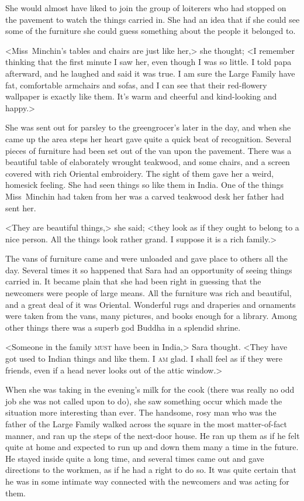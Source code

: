 She would almost have liked to join the group of loiterers who had stopped on the pavement to watch the things carried in. She had an idea that if she could see some of the furniture she could guess something about the people it belonged to.

<Miss~Minchin's tables and chairs are just like her,> she thought; <I remember thinking that the first minute I saw her, even though I was so little. I told papa afterward, and he laughed and said it was true. I am sure the Large Family have fat, comfortable armchairs and sofas, and I can see that their red-flowery wallpaper is exactly like them. It's warm and cheerful and kind-looking and happy.>

She was sent out for parsley to the greengrocer's later in the day, and when she came up the area steps her heart gave quite a quick beat of recognition. Several pieces of furniture had been set out of the van upon the pavement. There was a beautiful table of elaborately wrought teakwood, and some chairs, and a screen covered with rich Oriental embroidery. The sight of them gave her a weird, homesick feeling. She had seen things so like them in India. One of the things Miss~Minchin had taken from her was a carved teakwood desk her father had sent her.

<They are beautiful things,> she said; <they look as if they ought to belong to a nice person. All the things look rather grand. I suppose it is a rich family.>

The vans of furniture came and were unloaded and gave place to others all the day. Several times it so happened that Sara had an opportunity of seeing things carried in. It became plain that she had been right in guessing that the newcomers were people of large means. All the furniture was rich and beautiful, and a great deal of it was Oriental. Wonderful rugs and draperies and ornaments were taken from the vans, many pictures, and books enough for a library. Among other things there was a superb god Buddha in a splendid shrine.

<Someone in the family \textsc{must} have been in India,> Sara thought. <They have got used to Indian things and like them. I \textsc{am} glad. I shall feel as if they were friends, even if a head never looks out of the attic window.>

When she was taking in the evening's milk for the cook (there was really no odd job she was not called upon to do), she saw something occur which made the situation more interesting than ever. The handsome, rosy man who was the father of the Large Family walked across the square in the most matter-of-fact manner, and ran up the steps of the next-door house. He ran up them as if he felt quite at home and expected to run up and down them many a time in the future. He stayed inside quite a long time, and several times came out and gave directions to the workmen, as if he had a right to do so. It was quite certain that he was in some intimate way connected with the newcomers and was acting for them.


